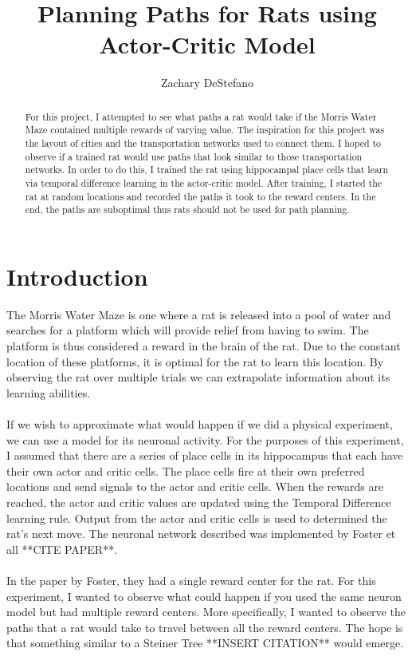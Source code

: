 \documentclass[conference]{IEEEtran}
\begin{document}
\title{Planning Paths for Rats using Actor-Critic Model}


\author{Zachary DeStefano}

\maketitle


\begin{abstract}
For this project, I attempted to see what paths a rat would take if the Morris Water Maze contained multiple rewards of varying value. The inspiration for this project was the layout of cities and the transportation networks used to connect them. I hoped to observe if a trained rat would use paths that look similar to those transportation networks. In order to do this, I trained the rat using hippocampal place cells that learn via temporal difference learning in the actor-critic model. After training, I started the rat at random locations and recorded the paths it took to the reward centers. In the end, the paths are suboptimal thus rats should not be used for path planning. 
\end{abstract}

\IEEEpeerreviewmaketitle



\section{Introduction}

The Morris Water Maze is one where a rat is released into a pool of water and searches for a platform which will provide relief from having to swim. The platform is thus considered a reward in the brain of the rat. Due to the constant location of these platforms, it is optimal for the rat to learn this location. By observing the rat over multiple trials we can extrapolate information about its learning abilities.\\
\\
If we wish to approximate what would happen if we did a physical experiment, we can use a model for its neuronal activity. For the purposes of this experiment, I assumed that there are a series of place cells in its hippocampus that each have their own actor and critic cells. The place cells fire at their own preferred locations and send signals to the actor and critic cells. When the rewards are reached, the actor and critic values are updated using the Temporal Difference learning rule. Output from the actor and critic cells is used to determined the rat's next move. The neuronal network described was implemented by Foster et all **CITE PAPER**. \\
\\
In the paper by Foster, they had a single reward center for the rat. For this experiment, I wanted to observe what could happen if you used the same neuron model but had multiple reward centers. More specifically, I wanted to observe the paths that a rat would take to travel between all the reward centers. The hope is that something similar to a Steiner Tree **INSERT CITATION** would emerge. 
\end{document}
